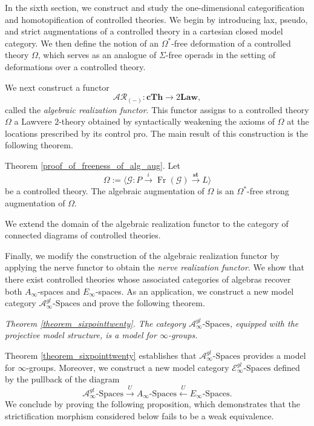 \documentclass{tac}
\begin{document}
In the sixth section, we construct and study the one-dimensional
categorification and homotopification of controlled theories. We begin by
introducing lax, pseudo, and strict augmentations of a controlled theory in a
cartesian closed model category. We then define the notion of an
$\Omega^*$-free deformation of a controlled theory $\Omega$, which serves as an analogue of $\Sigma$-free operads in the setting of
deformations over a controlled theory.

We next construct a functor
\[
\mathcal{AR}_{(-)}:\mathbf{cTh}\longrightarrow 2\mathbf{Law},
\]
called the \emph{algebraic realization functor}. This functor assigns to a
controlled theory $\Omega$ a Lawvere $2$-theory obtained by syntactically
weakening the axioms of $\Omega$ at the locations prescribed by its control
pro. The main result of this construction is the following theorem.


Theorem \ref{proof_of_freeness_of_alg_aug}.  Let
\[
\Omega:=\langle \mathcal{G}:P\xrightarrow{i}\operatorname{Fr}(\mathcal{G})
\xrightarrow{\mathbf{st}}L\rangle
\]
be a controlled theory. The algebraic augmentation of $\Omega$ is an
$\Omega^*$-free strong augmentation of $\Omega$.  


We extend the domain of the algebraic realization functor to the category of
connected diagrams of controlled theories.

Finally, we modify the construction of the algebraic realization functor by
applying the nerve functor to obtain the \emph{nerve realization functor}. We
show that there exist controlled theories whose associated categories of
algebras recover both $A_\infty$-spaces and $E_\infty$-spaces. As an
application, we construct a new model category $\mathcal{A}^{gl}_{\infty}\text{-Spaces}$ and prove the following theorem.


\emph{Theorem \ref{theorem_sixpointtwenty}. The category $\mathcal{A}^{gl}_{\infty}\text{-Spaces}$,
equipped with the projective model structure, is a model for $\infty$-groups.}

Theorem \ref{theorem_sixpointtwenty} establishes that
$\mathcal{A}^{gl}_{\infty}\text{-Spaces}$ provides a model for
$\infty$-groups. Moreover, we construct a new model category $\mathcal{E}^{gl}_{\infty}\text{-Spaces}$
defined by the pullback of the diagram
\[
\mathcal{A}^{gl}_{\infty}\text{-Spaces}
\xrightarrow{U}
A_{\infty}\text{-Spaces}
\xleftarrow{U}
E_{\infty}\text{-Spaces}.
\]
 We conclude by proving the following proposition, which demonstrates
that the strictification morphism considered below fails to be a weak
equivalence.
\end{document}
